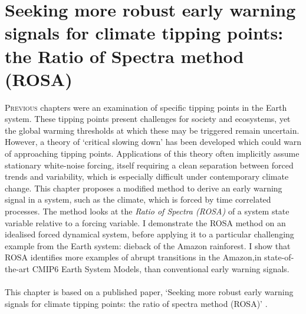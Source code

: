 \chapter{Seeking more robust early warning signals for climate tipping points: the Ratio of Spectra method (ROSA)}
\label{chapter:rosa}
\graphicspath{{ROSA/figs}}



\lettrine[lines=3,loversize=0.1,findent=0.1em,nindent=0em]{P}{revious} chapters were an examination of specific tipping points in the Earth system.
These tipping points present challenges for society and 
ecosystems, yet the global warming thresholds at which these may be triggered remain uncertain. However,
a theory of `critical slowing down' has been developed which could warn of approaching tipping points. 
Applications of this theory often implicitly assume stationary white-noise forcing,  itself requiring a clean separation
between forced trends and variability, which is especially difficult under contemporary climate change. 
This chapter proposes a modified method to derive an early warning signal in a 
system, such as the climate, which is forced by time correlated processes. 
The method looks at the \emph{Ratio of Spectra (ROSA)} of a system state variable relative to a forcing variable.   
I demonstrate the ROSA method on an idealised forced dynamical system, before applying it 
to a particular challenging example from the Earth system: dieback of the Amazon rainforest.
I show that ROSA identifies more examples of abrupt transitions in the Amazon,in state-of-the-art CMIP6 Earth System Models, than conventional early warning signals.
\\\\
This chapter is based on a published paper, `Seeking more robust early warning signals for climate tipping points: the ratio of spectra method (ROSA)' \parencite{Clarke2023}.


